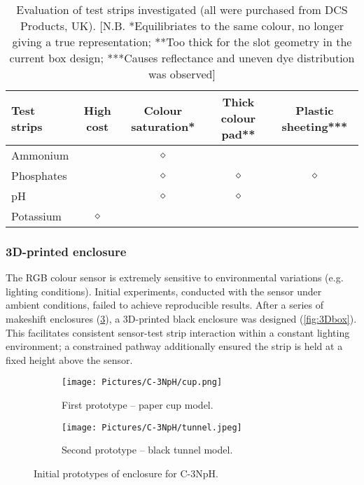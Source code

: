 	\begin{table}[H]
		\centering
		\begin{tabular}{ l  c  c  c  c } 
			\hline
			Test strips & High cost & Colour saturation* & Thick colour pad** & Plastic sheeting*** \\ 
			\hline
			Ammonium & & $\diamond$ & & \\ 
			
			Phosphates & & $\diamond$ & $\diamond$ & $\diamond$\\
			
			pH & & $\diamond$ & $\diamond$ &\\
			
			Potassium & $\diamond$ & & &\\
			\hline
		\end{tabular}
		\captionsetup{justification = centering}
		\caption{Evaluation of test strips investigated (all were purchased from DCS Products, UK). \small [N.B. *Equilibriates to the same colour, no longer giving a true representation; **Too thick for the slot geometry in the current box design; ***Causes reflectance and uneven dye distribution was observed]}
		\label{tab:strips}
	\end{table}


\subsubsection{3D-printed enclosure}  \label{sec:enclosure_c3nph}
The RGB colour sensor is extremely sensitive to environmental variations (e.g. lighting conditions). Initial experiments, conducted with the sensor under ambient conditions, failed to achieve reproducible results. After a series of makeshift enclosures (\cref{fig:boxevo}), a 3D-printed black enclosure was designed (\cref{fig:3Dbox}). This facilitates consistent sensor-test strip interaction within a constant lighting environment; a constrained pathway additionally ensured the strip is held at a fixed height above the sensor.\\

\begin{figure}[H]
	\centering
	\begin{subfigure}[b]{0.55\linewidth} 
		\centering
		\texttt{[image: Pictures/C-3NpH/cup.png]}
		\caption{First prototype -- paper cup model.}
		\label{subfig:proto1_cup}
	\end{subfigure}
	\begin{subfigure}[b]{0.4\linewidth}
	\centering
		\texttt{[image: Pictures/C-3NpH/tunnel.jpeg]}
		\caption{Second prototype -- black tunnel model.}
		\label{subfig:proto2_tunnel}
	\end{subfigure}
	\captionsetup{justification = centering}
	\caption{Initial prototypes of enclosure for C-3NpH.}
	\label{fig:boxevo}
\end{figure}   	

